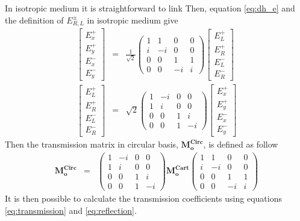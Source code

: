 %
In isotropic medium it is straightforward to link Then, equation \ref{eq:dh_e} and the definition of $E^\pm_{R,L}$ in isotropic medium give
\begin{eqnarray}
\begin{bmatrix}
E_x^+\\E_y^+\\E_x^-\\E_y^-
\end{bmatrix} &=& \frac{1}{\sqrt{2}}\begin{pmatrix}
1 & 1 & 0 & 0\\
i & -i & 0 & 0\\
0 & 0 & 1 & 1\\
0 & 0 & -i & i
\end{pmatrix}\begin{bmatrix}
E_L^+\\E_R^+\\E_L^-\\E_R^-
\end{bmatrix}\\
\begin{bmatrix}
E_L^+\\E_R^+\\E_L^-\\E_R^-
\end{bmatrix} &=& \sqrt{2}\begin{pmatrix}
1 & -i & 0 & 0\\
1 & i & 0 & 0\\
0 & 0 & 1 & i\\
0 & 0 & 1 & -i
\end{pmatrix}\begin{bmatrix}
E_x^+\\E_y^+\\E_x^-\\E_y^-
\end{bmatrix}
\end{eqnarray}
%
Then the transmission matrix in circular basis, $\bm{M_o^{\text{Circ}}}$, is defined as follow
\begin{eqnarray}
\bm{M_o^{\text{Circ}}} &=& \begin{pmatrix}
1 & -i & 0 & 0\\
1 & i & 0 & 0\\
0 & 0 & 1 & i\\
0 & 0 & 1 & -i
\end{pmatrix}\bm{M_o^{\text{Cart}}}\begin{pmatrix}
1 & 1 & 0 & 0\\
i & -i & 0 & 0\\
0 & 0 & 1 & 1\\
0 & 0 & -i & i
\end{pmatrix}
\end{eqnarray}
%
It is then possible to calculate the transmission coefficients using equations \ref{eq:transmission} and \ref{eq:reflection}.